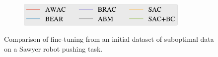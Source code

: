 \begin{figure}[H]
\begin{center}
\begin{subfigure}[b]{0.45\textwidth}
        \includegraphics[width=0.9\textwidth]{awac/figures/rig/pusher_random_legend-crop.pdf}
    \end{subfigure}
  \end{center}
  \vspace{0.1cm}
  \caption{
  Comparison of fine-tuning from an initial dataset of suboptimal data on a Sawyer robot pushing task.
  }
 \label{fig:gcrl}
\end{figure}
